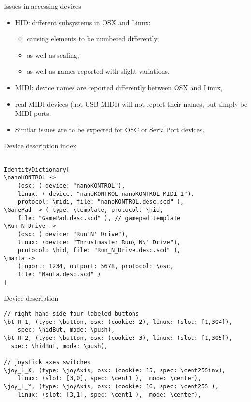 \documentclass[pdf,slideColor,colorBG,accumulate,total]{prosper}
\begin{document}
\begin{slide}{Issues in accessing devices}

\vspace*{1cm}

\begin{itemize}
 \item HID: different subsystems in OSX and Linux:
 \begin{itemize}
  \item causing elements to be numbered differently,
  \item as well as scaling, 
  \item as well as names reported with slight variations.
  \end{itemize}
 \item MIDI: device names are reported differently between OSX and Linux,
 \item real MIDI devices (not USB-MIDI) will not report their names, but simply be MIDI-ports.
 \item Similar issues are to be expected for OSC or SerialPort devices.
\end{itemize}

 
\end{slide}


\begin{slide}{Device description index}

\footnotesize
\begin{verbatim}

IdentityDictionary[
\nanoKONTROL -> 
	(osx: ( device: "nanoKONTROL"), 
	linux: ( device: "nanoKONTROL-nanoKONTROL MIDI 1"), 
	protocol: \midi, file: "nanoKONTROL.desc.scd" ),
\GamePad -> ( type: \template, protocol: \hid, 
	file: "GamePad.desc.scd" ), // gamepad template
\Run_N_Drive -> 
	(osx: ( device: "Run'N' Drive"),
	linux: (device: "Thrustmaster Run\'N\' Drive"), 
	protocol: \hid, file: "Run_N_Drive.desc.scd" ),
\manta -> 
	(inport: 1234, outport: 5678, protocol: \osc,
	file: "Manta.desc.scd" )
] 
\end{verbatim}
\end{slide}

\begin{slide}{Device description}

\footnotesize
\begin{verbatim}
// right hand side four labeled buttons
\bt_R_1, (type: \button, osx: (cookie: 2), linux: (slot: [1,304]), 
    spec: \hidBut, mode: \push),
\bt_R_2, (type: \button, osx: (cookie: 3), linux: (slot: [1,305]),
  spec: \hidBut, mode: \push),

// joystick axes switches
\joy_L_X, (type: \joyAxis, osx: (cookie: 15, spec: \cent255inv),
	linux: (slot: [3,0], spec: \cent1 ),  mode: \center),
\joy_L_Y, (type: \joyAxis, osx: (cookie: 16, spec: \cent255 ), 
	linux: (slot: [3,1], spec: \cent1 ),  mode: \center),
\end{verbatim}

 
\end{slide}
\end{document}
